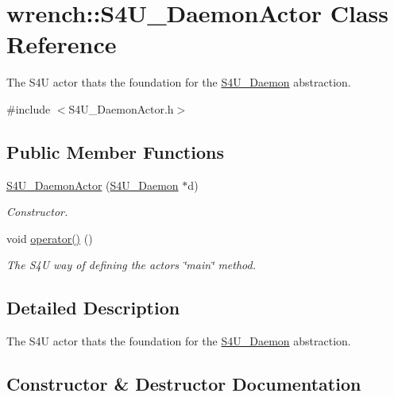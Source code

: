\hypertarget{classwrench_1_1_s4_u___daemon_actor}{}\section{wrench\+:\+:S4\+U\+\_\+\+Daemon\+Actor Class Reference}
\label{classwrench_1_1_s4_u___daemon_actor}


The S4U actor that\textquotesingle{}s the foundation for the \hyperlink{classwrench_1_1_s4_u___daemon}{S4\+U\+\_\+\+Daemon} abstraction.  




{\ttfamily \#include $<$S4\+U\+\_\+\+Daemon\+Actor.\+h$>$}

\subsection*{Public Member Functions}
\begin{DoxyCompactItemize}
\item 
\hyperlink{classwrench_1_1_s4_u___daemon_actor_a93470293602b656229cf003da3ecbae8}{S4\+U\+\_\+\+Daemon\+Actor} (\hyperlink{classwrench_1_1_s4_u___daemon}{S4\+U\+\_\+\+Daemon} $\ast$d)
\begin{DoxyCompactList}\small\item\em Constructor. \end{DoxyCompactList}\item 
\mbox{\label{classwrench_1_1_s4_u___daemon_actor_a02de8ede3faf436548ca0469b8833df0}} 
void \hyperlink{classwrench_1_1_s4_u___daemon_actor_a02de8ede3faf436548ca0469b8833df0}{operator()} ()
\begin{DoxyCompactList}\small\item\em The S4U way of defining the actor\textquotesingle{}s \char`\"{}main\char`\"{} method. \end{DoxyCompactList}\end{DoxyCompactItemize}


\subsection{Detailed Description}
The S4U actor that\textquotesingle{}s the foundation for the \hyperlink{classwrench_1_1_s4_u___daemon}{S4\+U\+\_\+\+Daemon} abstraction. 

\subsection{Constructor \& Destructor Documentation}
\mbox{\label{classwrench_1_1_s4_u___daemon_actor_a93470293602b656229cf003da3ecbae8}} 
